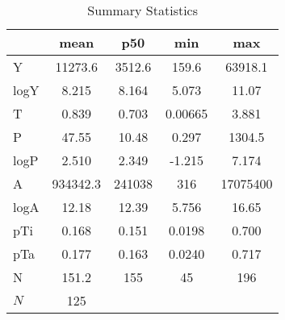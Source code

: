 \begin{table}[htbp]\centering
\def\sym#1{\ifmmode^{#1}\else\(^{#1}\)\fi}
\caption{Summary Statistics}
\begin{tabular}{l*{1}{cccc}}
\hline\hline
            &        mean&         p50&         min&         max\\
\hline
Y           &     11273.6&      3512.6&       159.6&     63918.1\\
logY        &       8.215&       8.164&       5.073&       11.07\\
T           &       0.839&       0.703&     0.00665&       3.881\\
P           &       47.55&       10.48&       0.297&      1304.5\\
logP        &       2.510&       2.349&      -1.215&       7.174\\
A           &    934342.3&      241038&         316&    17075400\\
logA        &       12.18&       12.39&       5.756&       16.65\\
pTi         &       0.168&       0.151&      0.0198&       0.700\\
pTa         &       0.177&       0.163&      0.0240&       0.717\\
N           &       151.2&         155&          45&         196\\
\hline
\(N\)       &         125&            &            &            \\
\hline\hline
\end{tabular}
\end{table}
